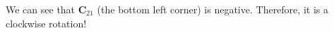 \documentclass{article}
\begin{document}
We can see that $\boldsymbol{C}_{21}$  (the bottom left corner) is negative. Therefore, it is a clockwise rotation!
%
%
%
%
%
%
\end{document}
